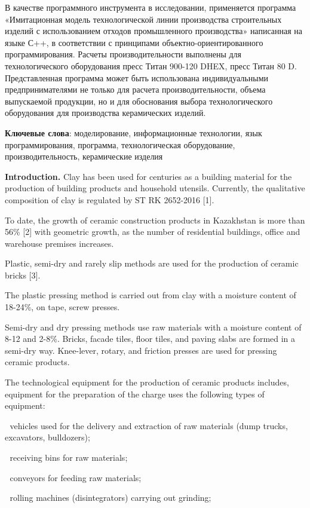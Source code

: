 В качестве программного инструмента в исследовании, применяется
программа «Имитационная модель технологической линии производства
строительных изделий с использованием отходов промышленного
производства» написанная на языке С++, в соответствии с принципами
объектно-ориентированного программирования. Расчеты производительности
выполнены для технологического оборудования пресс Титан 900-120 DHEX,
пресс Титан 80 D. Представленная программа может быть использована
индивидуальными предпринимателями не только для расчета
производительности, объема выпускаемой продукции, но и для обоснования
выбора технологического оборудования для производства керамических
изделий.

{\bfseries Ключевые слова}: моделирование, информационные технологии, язык
программирования, программа, технологическая оборудование,
производительность, керамические изделия

{\bfseries Introduction.} Clay has been used for centuries as a building
material for the production of building products and household utensils.
Currently, the qualitative composition of clay is regulated by ST RK
2652-2016 {[}1{]}.

To date, the growth of ceramic construction products in Kazakhstan is
more than 56\% {[}2{]} with geometric growth, as the number of
residential buildings, office and warehouse premises increases.

Plastic, semi-dry and rarely slip methods are used for the production of
ceramic bricks {[}3{]}.

The plastic pressing method is carried out from clay with a moisture
content of 18-24\%, on tape, screw presses.

Semi-dry and dry pressing methods use raw materials with a moisture
content of 8-12 and 2-8\%. Bricks, facade tiles, floor tiles, and paving
slabs are formed in a semi-dry way. Knee-lever, rotary, and friction
presses are used for pressing ceramic products.

The technological equipment for the production of ceramic products
includes, equipment for the preparation of the charge uses the following
types of equipment:

 vehicles used for the delivery and extraction of raw materials (dump
trucks, excavators, bulldozers);

 receiving bins for raw materials;

 conveyors for feeding raw materials;

{\bfseries } rolling machines (disintegrators) carrying out grinding;

